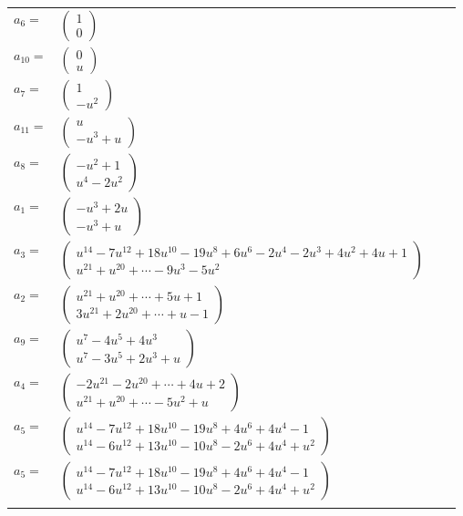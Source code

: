 \documentclass[1p]{elsarticle_modified}
\theoremstyle{definition}
\begin{document}
\begin{tabular}{m{7pt} m{180pt} m{7pt} m{180pt} }
\flushright $a_{6}=$&$\begin{pmatrix}1\\0\end{pmatrix}$ \\
\flushright $a_{10}=$&$\begin{pmatrix}0\\u\end{pmatrix}$ \\
\flushright $a_{7}=$&$\begin{pmatrix}1\\- u^2\end{pmatrix}$ \\
\flushright $a_{11}=$&$\begin{pmatrix}u\\- u^3+u\end{pmatrix}$ \\
\flushright $a_{8}=$&$\begin{pmatrix}- u^2+1\\u^4-2 u^2\end{pmatrix}$ \\
\flushright $a_{1}=$&$\begin{pmatrix}- u^3+2 u\\- u^3+u\end{pmatrix}$ \\
\flushright $a_{3}=$&$\begin{pmatrix}u^{14}-7 u^{12}+18 u^{10}-19 u^8+6 u^6-2 u^4-2 u^3+4 u^2+4 u+1\\u^{21}+u^{20}+\cdots-9 u^3-5 u^2\end{pmatrix}$ \\
\flushright $a_{2}=$&$\begin{pmatrix}u^{21}+u^{20}+\cdots+5 u+1\\3 u^{21}+2 u^{20}+\cdots+u-1\end{pmatrix}$ \\
\flushright $a_{9}=$&$\begin{pmatrix}u^7-4 u^5+4 u^3\\u^7-3 u^5+2 u^3+u\end{pmatrix}$ \\
\flushright $a_{4}=$&$\begin{pmatrix}-2 u^{21}-2 u^{20}+\cdots+4 u+2\\u^{21}+u^{20}+\cdots-5 u^2+u\end{pmatrix}$ \\
\flushright $a_{5}=$&$\begin{pmatrix}u^{14}-7 u^{12}+18 u^{10}-19 u^8+4 u^6+4 u^4-1\\u^{14}-6 u^{12}+13 u^{10}-10 u^8-2 u^6+4 u^4+u^2\end{pmatrix}$\\ \flushright $a_{5}=$&$\begin{pmatrix}u^{14}-7 u^{12}+18 u^{10}-19 u^8+4 u^6+4 u^4-1\\u^{14}-6 u^{12}+13 u^{10}-10 u^8-2 u^6+4 u^4+u^2\end{pmatrix}$\\&\end{tabular}
\end{document}
